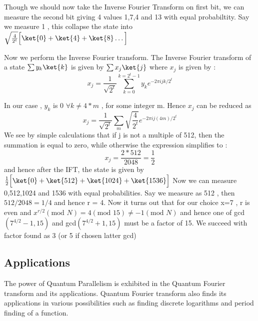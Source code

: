 \item Though we should now take the Inverse Fourier Transform on first bit, we can measure the second bit giving 4 values 1,7,4 and 13 with equal probabiltity. Say we measure 1 , this collapse the state into $\sqrt{\frac{4}{2^t}}\Big[\ket{0}+\ket{4}+\ket{8} \hdots  \Big]$
\item Now we perform the Inverse Fourier transform. The Inverse Fourier transform of a state $\sum y_k \ket{k}$ is given by $\sum x_j\ket{j}$ where $x_j$ is given by :
$$x_j = \frac{1}{\sqrt{2^t}}\sum_{k=0}^{k = 2^t-1}y_k e^{-2\pi i jk/2^t}$$
\item In our case , $y_k$ is 0 $\forall k \neq 4*m $ , for some integer m. Hence $x_j$ can be reduced as 
$$x_j = \frac{1}{\sqrt{2^t}}\sum_m \sqrt{\frac{4}{2^t}} e^{-2 \pi i j (4m)/2^t }$$
We see by simple calculations that if j is not a multiple of 512, then the summation is equal to zero, while otherwise the expression simplifies to :
$$x_j = \frac{2*512}{2048} = \frac{1}{2} $$
and hence after the IFT, the state is given by $\frac{1}{2}\Big[\ket{0}+\ket{512}+\ket{1024}+\ket{1536} \Big]$
Now we can measure 0,512,1024 and 1536 with equal probabilities. Say we measure as 512 , then $512/2048 = 1/4 $ and hence r = 4. Now it turns out that for our choice x=7 , r is even and $x^{r/2} (\text{mod }N) = 4(\text{mod }15) \neq -1(\text{mod }N) $ and hence one of gcd$(7^{4/2}  -1, 15)$ and gcd$(7^{4/2} + 1, 15)$ must be a factor of 15. We succeed with factor found as 3 (or 5 if chosen latter gcd)
\subsection{Applications}
The power of Quantum Parallelism is exhibited in the Quantum Fourier transform and its applications. Quantum Fourier transform also finds its applications in various possibilities such as finding discrete logarithms and period finding of a function.
\newpage